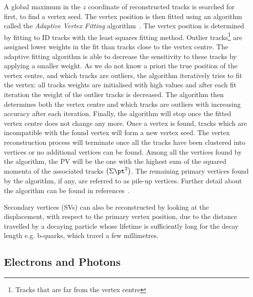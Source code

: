 			A global maximum in the $z$ coordinate of reconstructed tracks is searched for first, to find a vertex seed. The vertex position is then fitted using an algorithm called the \emph{Adaptive Vertex Fitting} algorithm~\cite{ATL-PHYS-PUB-2015-026,Fruhwirth:2007hz}. The vertex position is determined by fitting to \ac{ID} tracks with the least squares fitting method. Outlier tracks\footnote{Tracks that are far from the vertex centre} are assigned lower weights in the fit than tracks close to the vertex centre.
			The adaptive fitting algorithm is able to decrease the sensitivity to these tracks by applying a smaller weight. As we do not know a priori the true position of the vertex centre, and which tracks are outliers, the algorithm iteratively tries to fit the vertex: all tracks weights are initialised with high values and after each fit iteration the weight of the outlier tracks is decreased. The algorithm then determines both the vertex centre and which tracks are outliers with increasing accuracy after each iteration. Finally, the algorithm will stop once the fitted vertex centre does not change any more. Once a vertex is found, tracks which are incompatible with the found vertex will form a new vertex seed. The vertex reconstruction process will terminate once all the tracks have been clustered into vertices or no additional vertices can be found. Among all the vertices found by the algorithm, the \ac{PV} will be the one with the highest sum of the squared momenta of the associated tracks $\left ( \Sigma \pt^2 \right)$. The remaining primary vertices found by the algorithm, if any, are referred to as pile-up vertices. Further detail about the algorithm can be found in references~\cite{ATL-PHYS-PUB-2015-026,Fruhwirth:2007hz}. 

			Secondary vertices (\acs{SV}s) can also be reconstructed by looking at the displacement, with respect to the primary vertex position, due to the distance travelled by a decaying particle whose lifetime is sufficiently long for the decay length e.g. b-quarks, which travel a few millimetres.


		\subsection*{Electrons and Photons}

